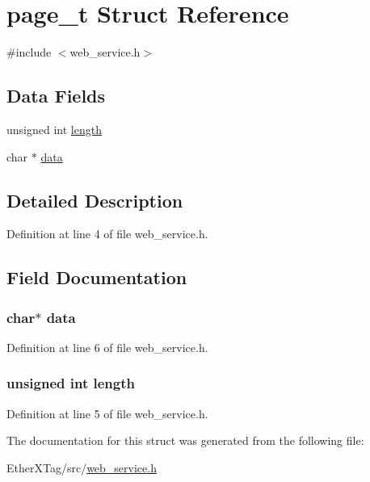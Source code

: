 \hypertarget{structpage__t}{\section{page\-\_\-t Struct Reference}
\label{structpage__t}
}


{\ttfamily \#include $<$web\-\_\-service.\-h$>$}

\subsection*{Data Fields}
\begin{DoxyCompactItemize}
\item 
unsigned int \hyperlink{structpage__t_ac8d42bcd4a44e078047ccd7291059238}{length}
\item 
char $\ast$ \hyperlink{structpage__t_a91a70b77df95bd8b0830b49a094c2acb}{data}
\end{DoxyCompactItemize}


\subsection{Detailed Description}


Definition at line 4 of file web\-\_\-service.\-h.



\subsection{Field Documentation}
\hypertarget{structpage__t_a91a70b77df95bd8b0830b49a094c2acb}{
\subsubsection[{data}]{\setlength{\rightskip}{0pt plus 5cm}char$\ast$ data}}\label{structpage__t_a91a70b77df95bd8b0830b49a094c2acb}


Definition at line 6 of file web\-\_\-service.\-h.

\hypertarget{structpage__t_ac8d42bcd4a44e078047ccd7291059238}{
\subsubsection[{length}]{\setlength{\rightskip}{0pt plus 5cm}unsigned int length}}\label{structpage__t_ac8d42bcd4a44e078047ccd7291059238}


Definition at line 5 of file web\-\_\-service.\-h.



The documentation for this struct was generated from the following file\-:\begin{DoxyCompactItemize}
\item 
Ether\-X\-Tag/src/\hyperlink{web__service_8h}{web\-\_\-service.\-h}\end{DoxyCompactItemize}
